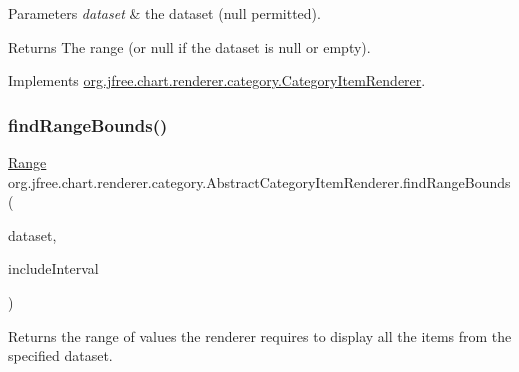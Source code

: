 \begin{DoxyParams}{Parameters}
{\em dataset} & the dataset ({\ttfamily null} permitted).\\
\hline
\end{DoxyParams}
\begin{DoxyReturn}{Returns}
The range (or {\ttfamily null} if the dataset is {\ttfamily null} or empty). 
\end{DoxyReturn}


Implements \mbox{\hyperlink{interfaceorg_1_1jfree_1_1chart_1_1renderer_1_1category_1_1_category_item_renderer_aa7294c25a26ffd1725d7920a6041a785}{org.\+jfree.\+chart.\+renderer.\+category.\+Category\+Item\+Renderer}}.

\mbox{\label{classorg_1_1jfree_1_1chart_1_1renderer_1_1category_1_1_abstract_category_item_renderer_af2965aa1633da598d5bd8e742f207aaf}} 
\subsubsection{\texorpdfstring{find\+Range\+Bounds()}{findRangeBounds()}\hspace{0.1cm}{\footnotesize\ttfamily [2/2]}}
{\footnotesize\ttfamily \mbox{\hyperlink{classorg_1_1jfree_1_1data_1_1_range}{Range}} org.\+jfree.\+chart.\+renderer.\+category.\+Abstract\+Category\+Item\+Renderer.\+find\+Range\+Bounds (\begin{DoxyParamCaption}\item[{\mbox{\hyperlink{interfaceorg_1_1jfree_1_1data_1_1category_1_1_category_dataset}{Category\+Dataset}}}]{dataset,  }\item[{boolean}]{include\+Interval }\end{DoxyParamCaption})\hspace{0.3cm}{\ttfamily [protected]}}

Returns the range of values the renderer requires to display all the items from the specified dataset.


